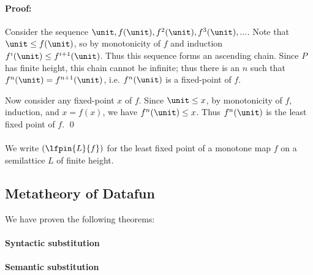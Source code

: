 \paragraph{Proof:}
Consider the sequence $\unit, f(\unit), f^2(\unit), f^3(\unit), ...$. Note that
$\unit \le f(\unit)$, so by monotonicity of $f$ and induction $f^i(\unit) \le
f^{i+1}(\unit)$. Thus this sequence forms an ascending chain. Since $P$ has
finite height, this chain cannot be infinite; thus there is an $n$ such that
$f^n(\unit) = f^{n+1}(\unit)$, i.e. $f^n(\unit)$ is a fixed-point of $f$.

Now consider any fixed-point $x$ of $f$. Since $\unit \le x$, by monotonicity of
$f$, induction, and $x = f(x)$, we have $f^n(\unit) \le x$. Thus $f^n(\unit)$ is
the least fixed point of $f$. \qed

\paragraph{}
We write $(\lfpin{L}{f})$ for the least fixed point of a monotone map $f$ on a
semilattice $L$ of finite height.




\subsection{Metatheory of Datafun}


We have proven the following theorems:

\paragraph{Syntactic substitution} 
\paragraph{Semantic substitution} 

\paragraph{}
